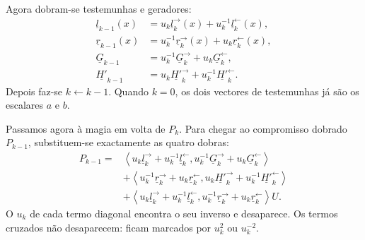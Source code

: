 Agora dobram-se testemunhas e geradores:
\begin{align*}
\underline l_{k-1}(x)
 &=u_k\underline l_k^{\rightarrow}(x)
   +u_k^{-1}\underline l_k^{\leftarrow}(x),\\
\underline r_{k-1}(x)
 &=u_k^{-1}\underline r_k^{\rightarrow}(x)
   +u_k\underline r_k^{\leftarrow}(x),\\
\underline G_{k-1}
 &=u_k^{-1}\underline G_k^{\rightarrow}
   +u_k\underline G_k^{\leftarrow},\\
\underline{H'}_{k-1}
 &=u_k\underline{H'}_k^{\rightarrow}
   +u_k^{-1}\underline{H'}_k^{\leftarrow}.
\end{align*}
Depois faz-se \(k\leftarrow k-1\). Quando \(k=0\), os dois vectores de
testemunhas já são os escalares \(a\) e \(b\).

Passamos agora à magia em volta de \(P_k\). Para chegar ao compromisso dobrado
\(P_{k-1}\), substituem-se exactamente as quatro dobras:
\begin{align*}
P_{k-1}={}&
\left\langle
 u_k\underline l_k^{\rightarrow}+u_k^{-1}\underline l_k^{\leftarrow},
 u_k^{-1}\underline G_k^{\rightarrow}+u_k\underline G_k^{\leftarrow}
\right\rangle\\
&+\left\langle
 u_k^{-1}\underline r_k^{\rightarrow}+u_k\underline r_k^{\leftarrow},
 u_k\underline{H'}_k^{\rightarrow}+u_k^{-1}\underline{H'}_k^{\leftarrow}
\right\rangle\\
&+\left\langle
 u_k\underline l_k^{\rightarrow}+u_k^{-1}\underline l_k^{\leftarrow},
 u_k^{-1}\underline r_k^{\rightarrow}+u_k\underline r_k^{\leftarrow}
\right\rangle U .
\end{align*}
O \(u_k\) de cada termo diagonal encontra o seu inverso e desaparece. Os termos
cruzados não desaparecem: ficam marcados por \(u_k^2\) ou \(u_k^{-2}\).

